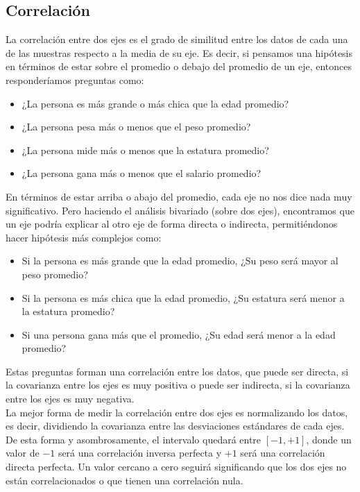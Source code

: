 \documentclass{article}
\begin{document}
\subsection{Correlación}

La correlación entre dos ejes es el grado de similitud entre los datos de cada una de las muestras respecto a la media de su eje. Es decir, si pensamos una hipótesis en términos de estar sobre el promedio o debajo del promedio de un eje, entonces responderíamos preguntas como:
\begin{itemize}
    \item ¿La persona es más grande o más chica que la edad promedio?
    \item ¿La persona pesa más o menos que el peso promedio?
    \item ¿La persona mide más o menos que la estatura promedio?
    \item ¿La persona gana más o menos que el salario promedio?
\end{itemize}
En términos de estar arriba o abajo del promedio, cada eje no nos dice nada muy significativo. Pero haciendo el análisis bivariado (sobre dos ejes), encontramos que un eje podría explicar al otro eje de forma directa o indirecta, permitiéndonos hacer hipótesis más complejos como:
\begin{itemize}
    \item Si la persona es más grande que la edad promedio, ¿Su peso será mayor al peso promedio?
    \item Si la persona es más chica que la edad promedio, ¿Su estatura será menor a la estatura promedio?
    \item Si una persona gana más que el promedio, ¿Su edad será menor a la edad promedio?
\end{itemize}
Estas preguntas forman una correlación entre los datos, que puede ser directa, si la covarianza entre los ejes es muy positiva o puede ser indirecta, si la covarianza entre los ejes es muy negativa.
\\[12pt]
La mejor forma de medir la correlación entre dos ejes es normalizando los datos, es decir, dividiendo la covarianza entre las desviaciones estándares de cada ejes. De esta forma y asombrosamente, el intervalo quedará entre $[-1, +1]$, donde un valor de $-1$ será una correlación inversa perfecta y $+1$ será una correlación directa perfecta. Un valor cercano a cero seguirá significando que los dos ejes no están correlacionados o que tienen una correlación nula.
\\[12pt]
\end{document}
